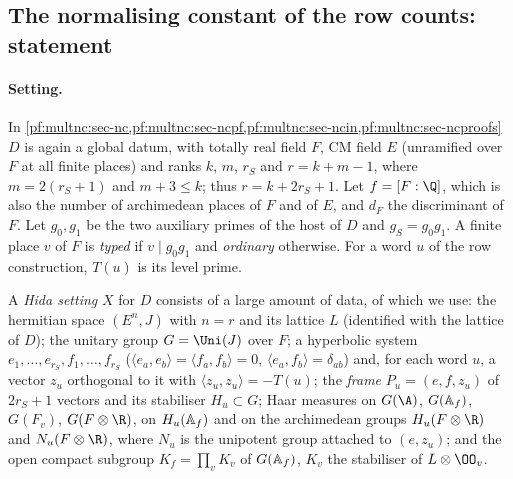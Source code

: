 \subsection{The normalising constant of the row counts: statement}\label{pf:multnc:sec-nc}

\paragraph{Setting.} In \cref{pf:multnc:sec-nc,pf:multnc:sec-ncpf,pf:multnc:sec-ncin,pf:multnc:sec-ncproofs} $D$ is again a global datum, with
totally real field $F$, CM field $E$ (unramified over $F$ at all finite places) and ranks $k$, $m$, $r_S$ and $r=k+m-1$,
where $m=2(r_S+1)$ and $m+3\le k$; thus $r=k+2r_S+1$. Let $f=[F:\Q]$, which is also the number of archimedean places of
$F$ and of $E$, and $d_F$ the discriminant of $F$. Let $g_0,g_1$ be the two auxiliary primes of the host of $D$ and
$g_S=g_0g_1$. A finite place $v$ of $F$ is \emph{typed} if $v\mid g_0g_1$ and \emph{ordinary} otherwise. For a word $u$ of
the row construction, $T(u)$ is its level prime.

A \emph{Hida setting} $X$ for $D$ consists of a large amount of data, of which we use: the hermitian space $(E^n,J)$ with
$n=r$ and its lattice $L$ (identified with the lattice of $D$); the unitary group $G=\Uni(J)$ over $F$; a hyperbolic
system $e_1,\dots,e_{r_S},f_1,\dots,f_{r_S}$ ($\langle e_a,e_b\rangle=\langle f_a,f_b\rangle=0$, $\langle e_a,f_b\rangle=
\delta_{ab}$) and, for each word $u$, a vector $z_u$ orthogonal to it with $\langle z_u,z_u\rangle=-T(u)$; the
\emph{frame} $P_u=(e,f,z_u)$ of $2r_S+1$ vectors and its stabiliser $H_u\subset G$; Haar measures on $G(\A)$,
$G(\mathbb{A}_{f})$, $G(F_v)$, $G(F\otimes\R)$, on $H_u(\mathbb{A}_{f})$ and on the archimedean groups $H_u(F\otimes\R)$ and
$N_u(F\otimes\R)$, where $N_u$ is the unipotent group attached to $(e,z_u)$; and the open compact subgroup
$K_f=\prod_vK_v$ of $G(\mathbb{A}_{f})$, $K_v$ the stabiliser of $L\otimes\OO_v$.

